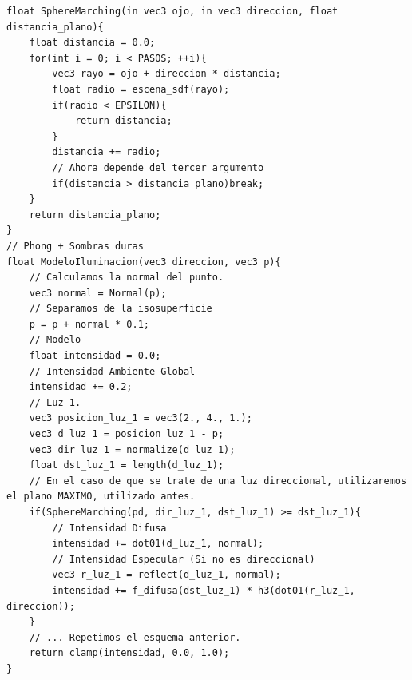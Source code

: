 
\newpage
\begin{lstlisting}
float SphereMarching(in vec3 ojo, in vec3 direccion, float distancia_plano){
    float distancia = 0.0;
    for(int i = 0; i < PASOS; ++i){
        vec3 rayo = ojo + direccion * distancia;
        float radio = escena_sdf(rayo);
        if(radio < EPSILON){
            return distancia;
        }
        distancia += radio;
        // Ahora depende del tercer argumento
        if(distancia > distancia_plano)break;
    }
    return distancia_plano;
}
// Phong + Sombras duras
float ModeloIluminacion(vec3 direccion, vec3 p){
    // Calculamos la normal del punto.
    vec3 normal = Normal(p);
    // Separamos de la isosuperficie
    p = p + normal * 0.1;
    // Modelo
    float intensidad = 0.0;
    // Intensidad Ambiente Global
    intensidad += 0.2;
    // Luz 1.
    vec3 posicion_luz_1 = vec3(2., 4., 1.);
    vec3 d_luz_1 = posicion_luz_1 - p;
    vec3 dir_luz_1 = normalize(d_luz_1);
    float dst_luz_1 = length(d_luz_1);
    // En el caso de que se trate de una luz direccional, utilizaremos el plano MAXIMO, utilizado antes.
    if(SphereMarching(pd, dir_luz_1, dst_luz_1) >= dst_luz_1){
        // Intensidad Difusa
        intensidad += dot01(d_luz_1, normal);
        // Intensidad Especular (Si no es direccional)
        vec3 r_luz_1 = reflect(d_luz_1, normal);
        intensidad += f_difusa(dst_luz_1) * h3(dot01(r_luz_1, direccion));
    }
    // ... Repetimos el esquema anterior.
    return clamp(intensidad, 0.0, 1.0);
}
\end{lstlisting}
\newpage
